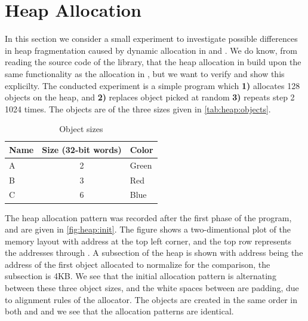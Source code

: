 \section{Heap Allocation}
\label{sec:res:heap}
In this section we consider a small experiment to investigate possible differences in heap fragmentation caused by dynamic allocation in {\C} and {\rust}.
We do know, from reading the source code of the library, that the heap allocation in {\rust} build upon the same functionality as the allocation in {\C}, but we want to verify and show this explicilty.
The conducted experiment is a simple program which \textbf{1)} allocates 128 objects on the heap, and \textbf{2)} replaces object picked at random \textbf{3)} repeats step 2 1024 times.
The objects are of the three sizes given in \autoref{tab:heap:objects}.

\begin{table}[H]
  \centering
  \begin{tabular}{l|c|l}
    \textbf{Name} & \textbf{Size (32-bit words)} & \textbf{Color} \\
    \hline
    A & 2 & Green \\
    B & 3 & Red \\
    C & 6 & Blue \\
    \hline
  \end{tabular}
  \caption{Object sizes}
  \label{tab:heap:objects}
\end{table}

The heap allocation pattern was recorded after the first phase of the program, and are given in \autoref{fig:heap:init}.
The figure shows a two-dimentional plot of the memory layout with address  at the top left corner, and the top row represents the addresses  through .
A subsection of the heap is shown with address  being the address of the first object allocated to normalize for the comparison, the subsection is 4KB.
We see that the initial allocation pattern is alternating between these three object sizes, and the white spaces between are padding, due to alignment rules of the allocator.
The objects are created in the same order in both {\C} and {\rust} and we see that the allocation patterns are identical.

